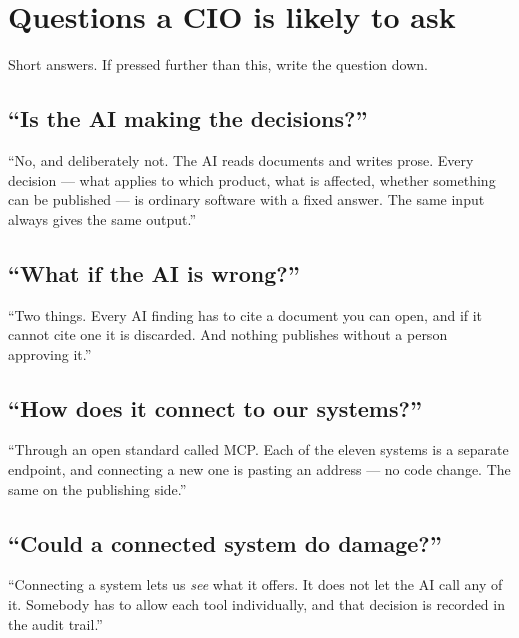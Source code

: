 \documentclass[11pt,a4paper]{article}
\begin{document}
\section{Questions a CIO is likely to ask}

Short answers. If pressed further than this, write the question down.

\subsection{``Is the AI making the decisions?''}

\begin{say}
``No, and deliberately not. The AI reads documents and writes prose. Every
decision --- what applies to which product, what is affected, whether something
can be published --- is ordinary software with a fixed answer. The same input
always gives the same output.''
\end{say}

\subsection{``What if the AI is wrong?''}

\begin{say}
``Two things. Every AI finding has to cite a document you can open, and if it
cannot cite one it is discarded. And nothing publishes without a person
approving it.''
\end{say}

\subsection{``How does it connect to our systems?''}

\begin{say}
``Through an open standard called MCP. Each of the eleven systems is a separate
endpoint, and connecting a new one is pasting an address --- no code change.
The same on the publishing side.''
\end{say}

\subsection{``Could a connected system do damage?''}

\begin{say}
``Connecting a system lets us \emph{see} what it offers. It does not let the AI
call any of it. Somebody has to allow each tool individually, and that decision
is recorded in the audit trail.''
\end{say}
\end{document}
